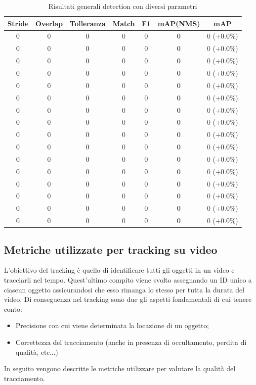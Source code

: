 \begin{table}[h!]
\centering
\begin{tabular}{|c|c|c|c|c|c|c|} 
\hline
Stride & Overlap & Tolleranza & Match & F1 & mAP(NMS) & mAP\\ [0.5ex] 
\hline
0 & 0 & 0 & 0 & 0 & 0 & 0 (+0.0\%)\\
0 & 0 & 0 & 0 & 0 & 0 & 0 (+0.0\%)\\
0 & 0 & 0 & 0 & 0 & 0 & 0 (+0.0\%)\\
0 & 0 & 0 & 0 & 0 & 0 & 0 (+0.0\%)\\
0 & 0 & 0 & 0 & 0 & 0 & 0 (+0.0\%)\\
0 & 0 & 0 & 0 & 0 & 0 & 0 (+0.0\%)\\
0 & 0 & 0 & 0 & 0 & 0 & 0 (+0.0\%)\\
0 & 0 & 0 & 0 & 0 & 0 & 0 (+0.0\%)\\
0 & 0 & 0 & 0 & 0 & 0 & 0 (+0.0\%)\\
0 & 0 & 0 & 0 & 0 & 0 & 0 (+0.0\%)\\
0 & 0 & 0 & 0 & 0 & 0 & 0 (+0.0\%)\\
0 & 0 & 0 & 0 & 0 & 0 & 0 (+0.0\%)\\
0 & 0 & 0 & 0 & 0 & 0 & 0 (+0.0\%)\\
0 & 0 & 0 & 0 & 0 & 0 & 0 (+0.0\%)\\
0 & 0 & 0 & 0 & 0 & 0 & 0 (+0.0\%)\\
0 & 0 & 0 & 0 & 0 & 0 & 0 (+0.0\%)\\
\hline
\end{tabular}
\caption{Risultati generali detection con diversi parametri}
\label{lista risultati}
\end{table}

\subsection{Metriche utilizzate per tracking su video}
L'obiettivo del tracking è quello di identificare tutti gli oggetti in un video e tracciarli nel tempo. Quest'ultimo compito viene svolto assegnando un ID unico a ciascun oggetto assicurandosi che esso rimanga lo stesso per tutta la durata del video. Di conseguenza nel tracking sono due gli aspetti fondamentali di cui tenere conto:
\begin{itemize}
\item Precisione con cui viene determinata la locazione di un oggetto;
\item Correttezza del tracciamento (anche in presenza di occultamento, perdita di qualità, etc...)
\end{itemize}
In seguito vengono descritte le metriche utilizzare per valutare la qualità del tracciamento.

